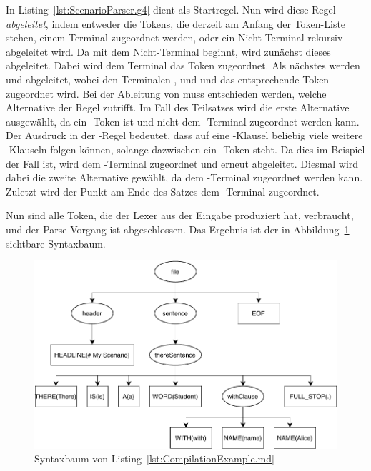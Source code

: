 In Listing~\ref{lst:ScenarioParser.g4} dient  als Startregel.
Nun wird diese Regel \emph{abgeleitet}, indem entweder die Tokens, die derzeit am Anfang der Token-Liste stehen, einem Terminal zugeordnet werden, oder ein Nicht-Terminal rekursiv abgeleitet wird.
Da  mit dem Nicht-Terminal  beginnt, wird zunächst dieses abgeleitet.
Dabei wird dem Terminal  das Token  zugeordnet.
Als nächstes werden  und  abgeleitet, wobei den Terminalen ,  und  und  das entsprechende Token zugeordnet wird.
Bei der Ableitung von  muss entschieden werden, welche Alternative der Regel zutrifft.
Im Fall des Teilsatzes  wird die erste Alternative ausgewählt, da  ein -Token ist und nicht dem -Terminal zugeordnet werden kann.
Der Ausdruck  in der -Regel bedeutet, dass auf eine -Klausel beliebig viele weitere -Klauseln folgen können, solange dazwischen ein -Token steht.
Da dies im Beispiel der Fall ist, wird  dem -Terminal zugeordnet und  erneut abgeleitet.
Diesmal wird dabei die zweite Alternative gewählt, da  dem -Terminal zugeordnet werden kann.
Zuletzt wird der Punkt am Ende des Satzes dem -Terminal zugeordnet.

Nun sind alle Token, die der Lexer aus der Eingabe produziert hat, verbraucht, und der Parse-Vorgang ist abgeschlossen.
Das Ergebnis ist der in Abbildung~\ref{fig:parsetree} sichtbare Syntaxbaum.

\begin{figure}
    \includegraphics[width=\textwidth]{chapter/fulib-scenarios/img/parsetree.pdf}
    \caption{Syntaxbaum von Listing~\ref{lst:CompilationExample.md}}
    \label{fig:parsetree}
\end{figure}

